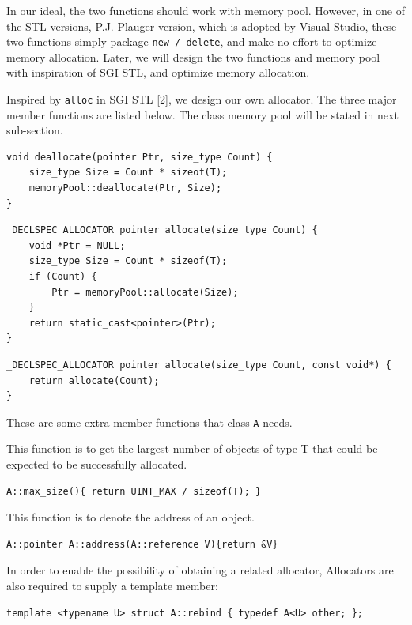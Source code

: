 \documentclass{article}
\begin{document}
In our ideal, the two functions should work with memory pool. However, in one of the STL versions, P.J. Plauger version, which is adopted by Visual Studio, these two functions simply package \texttt{new / delete}, and make no effort to optimize memory allocation. Later, we will design the two functions and memory pool with inspiration of SGI STL, and optimize memory allocation.

Inspired by \texttt{alloc} in SGI STL [2], we design our own allocator. The three major member functions are listed below. The class memory pool will be stated in next sub-section.

\begin{lstlisting}
void deallocate(pointer Ptr, size_type Count) {
	size_type Size = Count * sizeof(T);
	memoryPool::deallocate(Ptr, Size);
}
\end{lstlisting}
\begin{lstlisting}
_DECLSPEC_ALLOCATOR pointer allocate(size_type Count) {
	void *Ptr = NULL;
	size_type Size = Count * sizeof(T);
	if (Count) {
		Ptr = memoryPool::allocate(Size);
	}
	return static_cast<pointer>(Ptr);
}
\end{lstlisting}
\begin{lstlisting}
_DECLSPEC_ALLOCATOR pointer allocate(size_type Count, const void*) {
	return allocate(Count);
}
\end{lstlisting}
These are some extra member functions that class \texttt{A} needs.

This function is to get the largest number of objects of type T that could be expected to be successfully allocated.
\begin{lstlisting}
A::max_size(){ return UINT_MAX / sizeof(T); }
\end{lstlisting}
This function is to denote the address of an object.
\begin{lstlisting}
A::pointer A::address(A::reference V){return &V} 
\end{lstlisting}
In order to enable the possibility of obtaining a related allocator, Allocators are also required to supply a template member:
\begin{lstlisting}
template <typename U> struct A::rebind { typedef A<U> other; };
\end{lstlisting}
\end{document}
